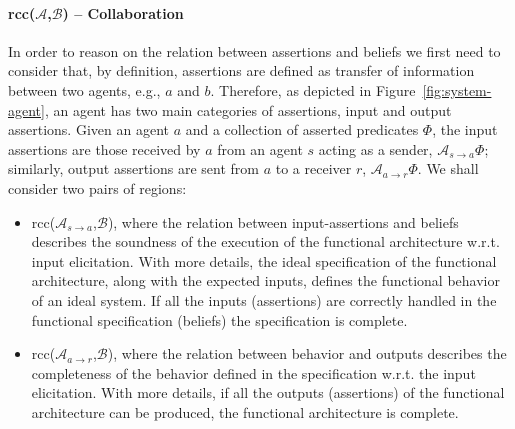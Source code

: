 \documentclass[conference]{IEEEtran}
\newcommand{\assertionRegion}{\mathcal{A}}
\newcommand{\beliefRegion}{\mathcal{B}}
\newcommand{\Rcc}[2]{rcc(#1,#2)}
\newcommand{\rassert}[3]{\mathcal{A}_{#1\rightarrow #2}#3}
\begin{document}
\paragraph{\Rcc{$\assertionRegion$}{$\beliefRegion$} -- Collaboration} In order
to reason on the relation between assertions and beliefs we first need to
consider that, by definition, assertions are defined as transfer of information
between two agents, e.g., $a$ and $b$.  Therefore, as depicted in
Figure~\ref{fig:system-agent}, an agent has two main categories of assertions,
input and output assertions.  Given an agent $a$ and a collection of asserted
predicates $\Phi$, the input assertions are those received by $a$ from an agent
$s$ acting as a sender, $\rassert{s}{a}{\Phi}$; similarly, output assertions
are sent from $a$ to a receiver $r$, $\rassert{a}{r}{\Phi}$. We shall consider
two pairs of regions:%
\begin{itemize}
	\item \Rcc{$\assertionRegion_{s\rightarrow a}$}{$\beliefRegion$},
		where the relation between input-assertions and beliefs
		describes the soundness of the execution of the functional
		architecture w.r.t. input elicitation. With more details, the
		ideal specification of the functional architecture, along with
		the expected inputs, defines the functional behavior of an
		ideal system.  If all the inputs (assertions) are correctly
		handled in the functional specification (beliefs) the
		specification is complete. 

	\item \Rcc{$\assertionRegion_{a\rightarrow r}$}{$\beliefRegion$},
		where the relation between behavior and outputs describes the
		completeness of the behavior defined in the specification
		w.r.t. the input elicitation.  With more details, if all the
		outputs (assertions) of the functional architecture can be
		produced, the functional architecture is complete.
\end{itemize}
\end{document}
